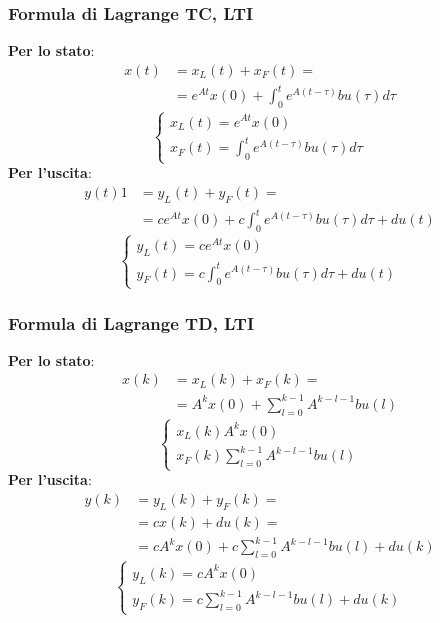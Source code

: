 \begin{landscape}
\begin{multicols*}{3}
    \subsubsection*{Formula di Lagrange TC, LTI}
    \textbf{Per lo stato}:
    \[
            \begin{split}
            x(t) &= x_L(t) + x_F(t) =\\
            &=e^{At} x(0) + \int_{0}^{t}e^{A(t-\tau)}bu(\tau)d \tau
            \end{split}
    \]
    \[
        \begin{cases}
            x_L(t) = e^{At} x(0)\\
            x_F(t) = \int_{0}^{t}e^{A(t-\tau)}bu(\tau)d \tau
        \end{cases}
    \]
    \textbf{Per l'uscita}:
    \[
            \begin{split}
            y(t) 1 &= y_L(t) + y_F(t) =\\
            &= ce^{At}x(0) + c \int_{0}^{t}e^{A(t-\tau)}bu(\tau)d \tau + du(t)
            \end{split}
    \]
    \[
        \begin{cases}
            y_L(t) = ce^{At}x(0)\\
            y_F(t) = c \int_{0}^{t}e^{A(t-\tau)}bu(\tau)d \tau + du(t)
        \end{cases}
    \]
    \subsubsection*{Formula di Lagrange TD, LTI}
    \textbf{Per lo stato}:
    \[
            \begin{split}
            x(k) &= x_L(k) + x_F(k) =\\
            &=A^k x(0) + \sum_{l=0}^{k-1}A^{k-l-1}bu(l)
            \end{split}
    \]
    \[
        \begin{cases}
            x_L(k) A^k x(0)\\
            x_F(k) \sum_{l=0}^{k-1}A^{k-l-1}bu(l)
        \end{cases}
    \]
    \textbf{Per l'uscita}:
    \[
        \begin{split}
            y(k) &= y_L(k) + y_F(k) =\\
            &= cx(k)+du(k) = \\
            &=cA^k x(0) + c\sum_{l=0}^{k-1}A^{k-l-1}bu(l) + du(k)
        \end{split}
    \]
    \[
        \begin{cases}
            y_L(k) = cA^k x(0)\\
            y_F(k) = c\sum_{l=0}^{k-1}A^{k-l-1}bu(l) + du(k)
        \end{cases}
    \]

\end{multicols*}
\end{landscape}
